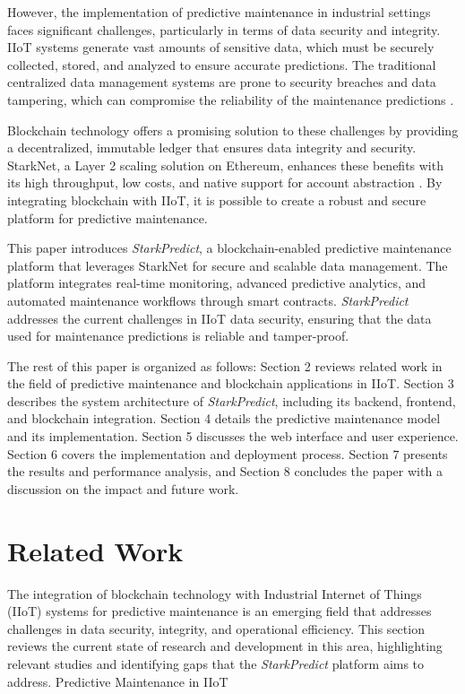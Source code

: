 \documentclass{article}
\begin{document}
However, the implementation of predictive maintenance in industrial settings faces significant challenges, particularly in terms of data security and integrity. IIoT systems generate vast amounts of sensitive data, which must be securely collected, stored, and analyzed to ensure accurate predictions. The traditional centralized data management systems are prone to security breaches and data tampering, which can compromise the reliability of the maintenance predictions \cite{atzori2010internet}.

Blockchain technology offers a promising solution to these challenges by providing a decentralized, immutable ledger that ensures data integrity and security. StarkNet, a Layer 2 scaling solution on Ethereum, enhances these benefits with its high throughput, low costs, and native support for account abstraction \cite{ben2019starknet}. By integrating blockchain with IIoT, it is possible to create a robust and secure platform for predictive maintenance.

This paper introduces \textit{StarkPredict}, a blockchain-enabled predictive maintenance platform that leverages StarkNet for secure and scalable data management. The platform integrates real-time monitoring, advanced predictive analytics, and automated maintenance workflows through smart contracts. \textit{StarkPredict} addresses the current challenges in IIoT data security, ensuring that the data used for maintenance predictions is reliable and tamper-proof.

The rest of this paper is organized as follows: Section 2 reviews related work in the field of predictive maintenance and blockchain applications in IIoT. Section 3 describes the system architecture of \textit{StarkPredict}, including its backend, frontend, and blockchain integration. Section 4 details the predictive maintenance model and its implementation. Section 5 discusses the web interface and user experience. Section 6 covers the implementation and deployment process. Section 7 presents the results and performance analysis, and Section 8 concludes the paper with a discussion on the impact and future work.

\section{Related Work}

The integration of blockchain technology with Industrial Internet of Things (IIoT) systems for predictive maintenance is an emerging field that addresses challenges in data security, integrity, and operational efficiency. This section reviews the current state of research and development in this area, highlighting relevant studies and identifying gaps that the \textit{StarkPredict} platform aims to address.
Predictive Maintenance in IIoT
\end{document}
